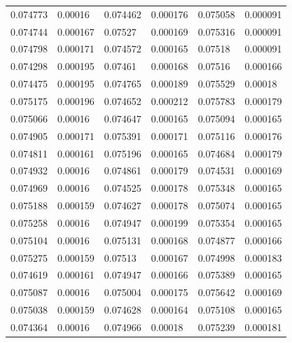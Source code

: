 \documentclass [11pt, proquest] {uwthesis}[2020/02/24]
\begin{document}
\begin{table}[ht]
\begin{tabular}{llllll}
0.074773 & 0.00016 & 0.074462 & 0.000176 & 0.075058 & 0.000091 \\
0.074744 & 0.000167 & 0.07527 & 0.000169 & 0.075316 & 0.000091 \\
0.074798 & 0.000171 & 0.074572 & 0.000165 & 0.07518 & 0.000091 \\
0.074298 & 0.000195 & 0.07461 & 0.000168 & 0.07516 & 0.000166 \\
0.074475 & 0.000195 & 0.074765 & 0.000189 & 0.075529 & 0.00018 \\
0.075175 & 0.000196 & 0.074652 & 0.000212 & 0.075783 & 0.000179 \\
0.075066 & 0.00016 & 0.074647 & 0.000165 & 0.075094 & 0.000165 \\
0.074905 & 0.000171 & 0.075391 & 0.000171 & 0.075116 & 0.000176 \\
0.074811 & 0.000161 & 0.075196 & 0.000165 & 0.074684 & 0.000179 \\
0.074932 & 0.00016 & 0.074861 & 0.000179 & 0.074531 & 0.000169 \\
0.074969 & 0.00016 & 0.074525 & 0.000178 & 0.075348 & 0.000165 \\
0.075188 & 0.000159 & 0.074627 & 0.000178 & 0.075074 & 0.000165 \\
0.075258 & 0.00016 & 0.074947 & 0.000199 & 0.075354 & 0.000165 \\
0.075104 & 0.00016 & 0.075131 & 0.000168 & 0.074877 & 0.000166 \\
0.075275 & 0.000159 & 0.07513 & 0.000167 & 0.074998 & 0.000183 \\
0.074619 & 0.000161 & 0.074947 & 0.000166 & 0.075389 & 0.000165 \\
0.075087 & 0.00016 & 0.075004 & 0.000175 & 0.075642 & 0.000169 \\
0.075038 & 0.000159 & 0.074628 & 0.000164 & 0.075108 & 0.000165 \\
0.074364 & 0.00016 & 0.074966 & 0.00018 & 0.075239 & 0.000181
\end{tabular}
\end{table}
\end{document}
